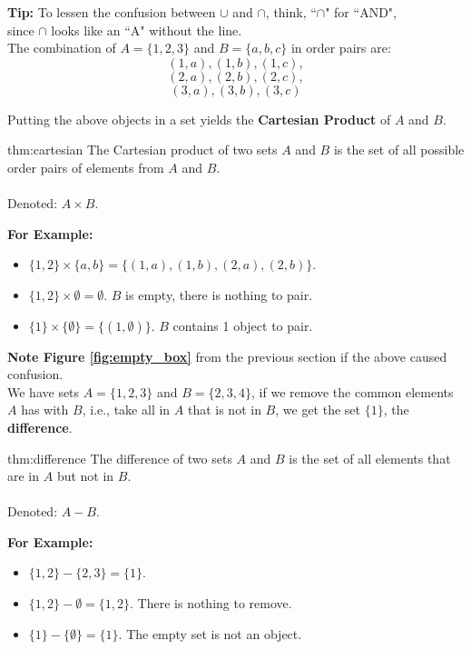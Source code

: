\noindent
\textbf{Tip:} To lessen the confusion between $\cup$ and $\cap$, think, ``$\cap$" for ``AND",\\
since $\cap$ looks like an ``A" without the line.\\

\noindent
The combination of $A=\{1,2,3\}$ and $B=\{a,b,c\}$ in order pairs are:
$$(1,a), (1,b), (1,c), $$
$$(2,a), (2,b), (2,c), $$
$$(3,a), (3,b), (3,c)$$

\noindent
Putting the above objects in a set yields the \textbf{Cartesian Product} of $A$ and $B$.

\begin{theo}{thm:cartesian}
    The Cartesian product of two sets $A$ and $B$ is the set of all possible order
    pairs of elements from $A$ and $B$.\\\\
    Denoted: $A \times B$.
\end{theo}

\noindent
\textbf{For Example:}
\begin{itemize}
    \item $\{1, 2\} \times \{a, b\} = \{(1,a), (1,b), (2,a), (2,b)\}$.
    \item $\{1,2\} \times \emptyset = \emptyset$. $B$ is empty, there is nothing to pair.
    \item $\{1\} \times \{\emptyset\} = \{(1,\emptyset)\}$. $B$ contains 1 object to pair.
\end{itemize}
\textbf{Note Figure \ref{fig:empty_box}} from the previous section if the above caused confusion.\\

\noindent
We have sets $A=\{1,2,3\}$ and $B=\{2,3,4\}$, if we remove the common elements
$A$ has with $B$, i.e., take all in $A$ that is not in $B$, we get the set $\{1\}$, the \textbf{difference}.\\

\begin{theo}[Difference]{thm:difference}
    The difference of two sets $A$ and $B$ is the set of all elements that are in $A$ but not in $B$.\\\\
    Denoted: $A - B$.
\end{theo}

\noindent
\textbf{For Example:}
\begin{itemize}
    \item $\{1, 2\} - \{2, 3\} = \{1\}$.
    \item $\{1,2\} - \emptyset = \{1, 2\}$. There is nothing to remove.
    \item $\{1\} - \{\emptyset\} = \{1\}$. The empty set is not an object.
\end{itemize}


